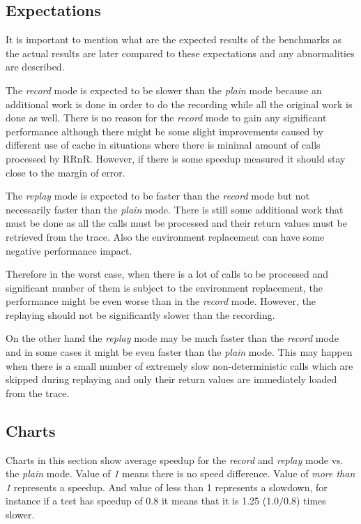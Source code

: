 \documentclass[thesis=M,english,hidelinks]{FITthesis}[2012/10/20]
\begin{document}
		\subsection{Expectations}
		It is important to mention what are the expected results of the benchmarks as the actual results are later compared to these expectations and any abnormalities are described.\par
		
		The \emph{record} mode is expected to be slower than the \emph{plain} mode because an additional work is done in order to do the recording while all the original work is done as well. There is no reason for the \emph{record} mode to gain any significant performance although there might be some slight improvements caused by different use of cache in situations where there is minimal amount of calls processed by RRnR. However, if there is some speedup measured it should stay close to the margin of error.\par
		
		The \emph{replay} mode is expected to be faster than the \emph{record} mode but not necessarily faster than the \emph{plain} mode. There is still some additional work that must be done as all the calls must be processed and their return values must be retrieved from the trace. Also the environment replacement can have some negative performance impact.\par
		
		Therefore in the worst case, when there is a lot of calls to be processed and significant number of them is subject to the environment replacement, the performance might be even worse than in the \emph{record} mode. However, the replaying should not be significantly slower than the recording.\par
		
		On the other hand the \emph{replay} mode may be much faster than the \emph{record} mode and in some cases it might be even faster than the \emph{plain} mode. This may happen when there is a small number of extremely slow non-deterministic calls which are skipped during replaying and only their return values are immediately loaded from the trace.\par
		
		\subsection{Charts}
		Charts in this section show average speedup for the \emph{record} and \emph{replay} mode vs. the \emph{plain} mode. Value of \emph{1} means there is no speed difference. Value of \emph{more than 1} represents a speedup. And value of {less than 1} represents a slowdown, for instance if a test has speedup of 0.8 it means that it is 1.25 ($1.0/0.8$) times slower.\par
		
\end{document}
